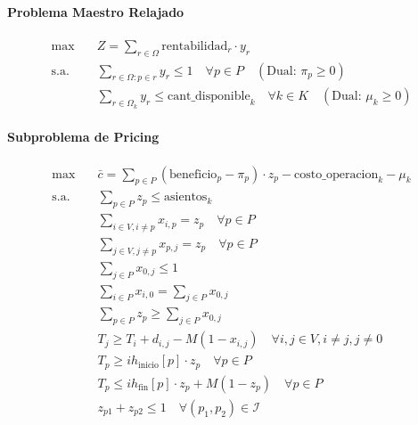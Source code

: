 \documentclass[12pt]{article}
\numberwithin{algorithm}{section}
\begin{document}
\paragraph{Problema Maestro Relajado}

\begin{align}
  \max & \quad Z = \sum_{r \in \Omega} \text{rentabilidad}_r \cdot y_r \label{eq:cg_obj}\\
  \text{s.a.} & \quad \sum_{r \in \Omega: p \in r} y_r \leq 1 \quad \forall p \in P \quad (\text{Dual: } \pi_p \geq 0) \label{eq:cg_pacientes}\\
  & \quad \sum_{r \in \Omega_k} y_r \leq \text{cant\_disponible}_k \quad \forall k \in K \quad (\text{Dual: } \mu_k \geq 0) \label{eq:cg_flota}
\end{align}

\paragraph{Subproblema de Pricing}

\begin{align}
  \max \quad & \bar{c} = \sum_{p \in P} (\text{beneficio}_p - \pi_p) \cdot z_p - \text{costo\_operacion}_k - \mu_k \label{eq:cg_pricing}\\
  \text{s.a.} \quad
  & \sum_{p \in P} z_p \leq \text{asientos}_k \label{eq:pr_cap_cg}\\
  & \sum_{i \in V, i \neq p} x_{i,p} = z_p \quad \forall p \in P \label{eq:pr_in_cg}\\
  & \sum_{j \in V, j \neq p} x_{p,j} = z_p \quad \forall p \in P \label{eq:pr_out_cg}\\
  & \sum_{j \in P} x_{0,j} \leq 1 \label{eq:pr_depot_out}\\
  & \sum_{i \in P} x_{i,0} = \sum_{j \in P} x_{0,j} \label{eq:pr_depot_in}\\
  & \sum_{p \in P} z_p \geq \sum_{j \in P} x_{0,j} \label{eq:pr_min_visita}\\
  & T_j \geq T_i + d_{i,j} - M(1 - x_{i,j}) \quad \forall i, j \in V, i \neq j, j \neq 0 \label{eq:pr_subtours}\\
  & T_p \geq ih_{\text{inicio}}[p] \cdot z_p \quad \forall p \in P \label{eq:pr_tw_inf}\\
  & T_p \leq ih_{\text{fin}}[p] \cdot z_p + M(1 - z_p) \quad \forall p \in P \label{eq:pr_tw_sup}\\
  & z_{p1} + z_{p2} \leq 1 \quad \forall (p_1, p_2) \in \mathcal{I} \label{eq:pr_incompat}
\end{align}
\end{document}
